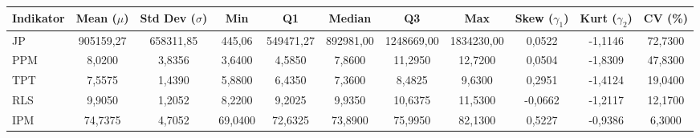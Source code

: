 \begin{adjustbox}{max width=\textwidth}
\small
\begin{tabular}{|>{\centering\arraybackslash}p{2.5cm}|c|c|c|c|c|c|c|c|c|c|}
\hline
\textbf{Indikator} & \textbf{Mean ($\mu$)} & \textbf{Std Dev ($\sigma$)} & \textbf{Min} & \textbf{Q1} & \textbf{Median} & \textbf{Q3} & \textbf{Max} & \textbf{Skew ($\gamma_1$)} & \textbf{Kurt ($\gamma_2$)} & \textbf{CV (\%)} \\
\hline
JP & 905159,27 & 658311,85 & 445,06 & 549471,27 & 892981,00 & 1248669,00 & 1834230,00 & 0,0522 & -1,1146 & 72,7300 \\
PPM & 8,0200 & 3,8356 & 3,6400 & 4,5850 & 7,8600 & 11,2950 & 12,7200 & 0,0504 & -1,8309 & 47,8300 \\
TPT & 7,5575 & 1,4390 & 5,8800 & 6,4350 & 7,3600 & 8,4825 & 9,6300 & 0,2951 & -1,4124 & 19,0400 \\
RLS & 9,9050 & 1,2052 & 8,2200 & 9,2025 & 9,9350 & 10,6375 & 11,5300 & -0,0662 & -1,2117 & 12,1700 \\
IPM & 74,7375 & 4,7052 & 69,0400 & 72,6325 & 73,8900 & 75,9950 & 82,1300 & 0,5227 & -0,9386 & 6,3000 \\
\hline
\end{tabular}
\end{adjustbox}
